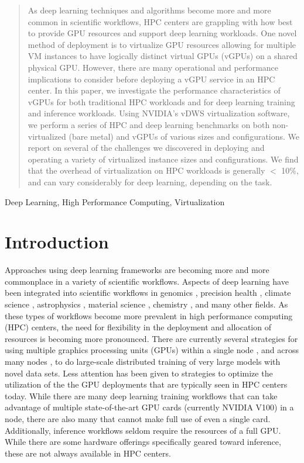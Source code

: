 \documentclass[conference]{IEEEtran}
\begin{document}
\begin{abstract}
As deep learning techniques and algorithms become more and more common in scientific workflows, HPC centers are grappling with how best to provide GPU resources and support deep learning workloads. One novel method of deployment is to virtualize GPU resources allowing for multiple VM instances to have logically distinct virtual GPUs (vGPUs) on a shared physical GPU. However, there are many operational and performance implications to consider before deploying a vGPU service in an HPC center. In this paper, we investigate the performance characteristics of vGPUs for both traditional HPC workloads and for deep learning training and inference workloads. Using NVIDIA's vDWS virtualization software, we perform a series of HPC and deep learning benchmarks on both non-virtualized (bare metal) and vGPUs of various sizes and configurations. We report on several of the challenges we discovered in deploying and operating a variety of virtualized instance sizes and configurations. We find that the overhead of virtualization on HPC workloads is generally $<$ 10\%, and can vary considerably for deep learning, depending on the task.
\end{abstract}

\begin{IEEEkeywords}
Deep Learning, High Performance Computing, Virtualization
\end{IEEEkeywords}

\section{Introduction}
Approaches using deep learning frameworks are becoming more and more commonplace in a variety of scientific workflows. Aspects of deep learning have been integrated into scientific workflows in genomics \cite{genomics}, precision health \cite{prec-health}, climate science \cite{climate}, astrophysics \cite{astro}, material science \cite{material-science}, chemistry \cite{chemistry}, and many other fields. As these types of workflows become more prevalent in high performance computing (HPC) centers, the need for flexibility in the deployment and allocation of resources is becoming more pronounced. There are currently several strategies for using multiple graphics processing units (GPUs) within a single node \cite{mg-sn-1 , mg-sn-2}, and across many nodes \cite{mg-mn-1, mg-mn-2}, to do large-scale distributed training of very large models with novel data sets. Less attention has been given to strategies to optimize the utilization of the the GPU deployments that are typically seen in HPC centers today. While there are many deep learning training workflows that can take advantage of multiple state-of-the-art GPU cards (currently NVIDIA V100) in a node, there are also many that cannot make full use of even a single card. Additionally, inference workflows seldom require the resources of a full GPU. While there are some hardware offerings specifically geared toward inference, these are not always available in HPC centers.
\end{document}
